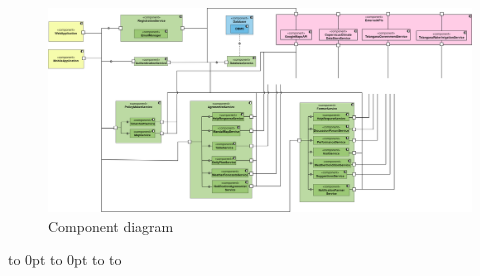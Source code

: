 \def\fillandplacepagenumber{%
 \par\pagestyle{empty}%
\vbox to 0pt{\vss}\vfill
\vbox to 0pt{\baselineskip0pt
   \hbox to\linewidth{\hss}%
   \setlength{\footskip}{70pt}
   \baselineskip\footskip
   \hbox to\linewidth{%
     \hfil\thepage\hfil}\vss}}

\begin{landscape}
\begin{figure}[h]
\vspace*{-2cm}
\noindent
\centering
\centerline{\includegraphics[scale = 0.2]{./Images/Component diagram.png}}
    \caption{Component diagram}
    \vspace*{-12cm}
\end{figure}
\fillandplacepagenumber
\end{landscape}

